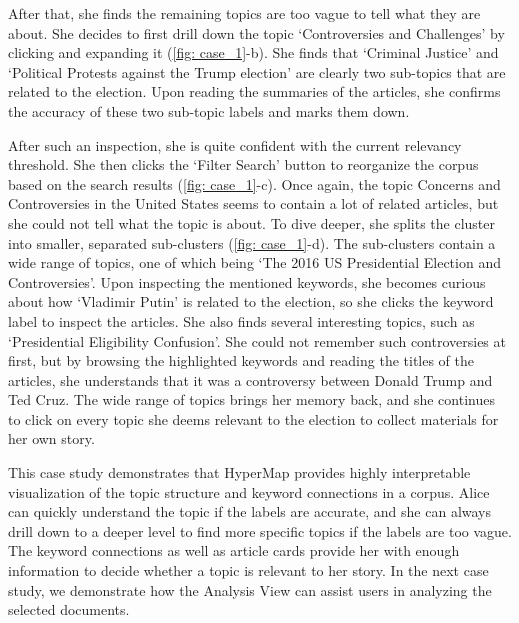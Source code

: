 After that, she finds the remaining topics are too vague to tell what they are about. 
She decides to first drill down the topic \textcolor{controversies_and_challenges}{`Controversies and Challenges'} by clicking and expanding it (\autoref{fig: case_1}-b).
She finds that \textcolor{criminal_justice}{`Criminal Justice'} and \textcolor{political_protests}{`Political Protests against the Trump election'} are clearly two sub-topics that are related to the election.
Upon reading the summaries of the articles, she confirms the accuracy of these two sub-topic labels and marks them down.

After such an inspection, she is quite confident with the current relevancy threshold. 
She then clicks the `Filter Search' button to reorganize the corpus based on the search results (\autoref{fig: case_1}-c).
Once again, the topic \textcolor{concerns_and_controversies}{Concerns and Controversies in the United States} seems to contain a lot of related articles, but she could not tell what the topic is about.
To dive deeper, she splits the cluster into smaller, separated sub-clusters (\autoref{fig: case_1}-d).
The sub-clusters contain a wide range of topics, one of which being \textcolor{presidential_election_and_controversies}{`The 2016 US Presidential Election and Controversies'}.
Upon inspecting the mentioned keywords, she becomes curious about how `Vladimir Putin' is related to the election, so she clicks the keyword label to inspect the articles.
She also finds several interesting topics, such as \textcolor{presidential_eligibility}{`Presidential Eligibility Confusion'}.
She could not remember such controversies at first, but by browsing the highlighted keywords and reading the titles of the articles, she understands that it was a controversy between Donald Trump and Ted Cruz.
The wide range of topics brings her memory back, and she continues to click on every topic she deems relevant to the election to collect materials for her own story.

This case study demonstrates that HyperMap provides highly interpretable visualization of the topic structure and keyword connections in a corpus. 
Alice can quickly understand the topic if the labels are accurate, and she can always drill down to a deeper level to find more specific topics if the labels are too vague.
The keyword connections as well as article cards provide her with enough information to decide whether a topic is relevant to her story.
In the next case study, we demonstrate how the Analysis View can assist users in analyzing the selected documents.

